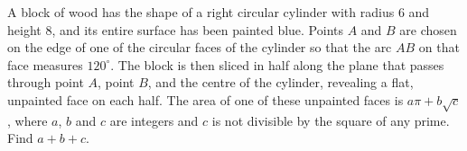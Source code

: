 A block of wood has the shape of a right circular cylinder with radius $6$ and height $8$, and its entire surface has been painted blue. Points $A$ and $B$ are chosen on the edge of one of the circular faces of the cylinder so that the arc $AB$ on that face measures $120^\circ$. The block is then sliced in half along the plane that passes through point $A$, point $B$, and the centre of the cylinder, revealing a flat, unpainted face on each half. The area of one of these unpainted faces is $a\pi+b\sqrt c$, where $a$, $b$ and $c$ are integers and $c$ is not divisible by the square of any prime. Find $a+b+c$.
